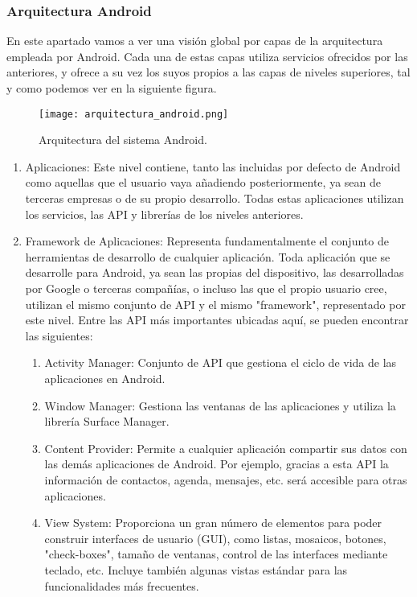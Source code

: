 	\subsubsection{Arquitectura Android}
En este apartado vamos a ver una visión global por capas de la
 arquitectura empleada por Android. Cada una de estas capas utiliza
 servicios ofrecidos por las anteriores, y ofrece a su vez los suyos 
propios a las capas de niveles superiores, tal y como podemos ver
 en la siguiente figura.
\begin{figure}[h]
\texttt{[image: arquitectura\_android.png]} 
\caption{Arquitectura del sistema Android.}
\end{figure}


\begin{enumerate}
\item	Aplicaciones: Este nivel contiene, tanto las incluidas por defecto 
de Android como aquellas que el usuario vaya añadiendo posteriormente,
 ya sean de terceras empresas o de su propio desarrollo. 
Todas estas aplicaciones utilizan los servicios, las API y
 librerías de los niveles anteriores. 
\item	Framework de Aplicaciones: Representa fundamentalmente el
 conjunto de herramientas de desarrollo de cualquier aplicación. 
Toda aplicación que se desarrolle para Android, ya sean las propias 
del dispositivo, las desarrolladas por Google o terceras compañías,
 o incluso las que el propio usuario cree, utilizan el mismo conjunto
 de API y el mismo "framework", representado por este nivel. 
Entre las API más importantes ubicadas aquí, se pueden encontrar las siguientes:
\begin{enumerate}
\item	Activity Manager: Conjunto de API que gestiona el ciclo de vida de
 las aplicaciones en Android.
\item	Window Manager: Gestiona las ventanas de las aplicaciones y
 utiliza la librería Surface Manager.
\item	Content Provider: Permite a cualquier aplicación compartir sus
 datos con las demás aplicaciones de Android. Por ejemplo, gracias a 
esta API la información de contactos, agenda, mensajes, etc. 
será accesible para otras aplicaciones.
\item	View System: Proporciona un gran número de elementos para poder
 construir interfaces de usuario (GUI), como listas, mosaicos, 
botones, "check-boxes", tamaño de ventanas, control de las
 interfaces mediante teclado, etc. Incluye también algunas vistas
 estándar para las funcionalidades más frecuentes.

\end{enumerate}
\end{enumerate}
